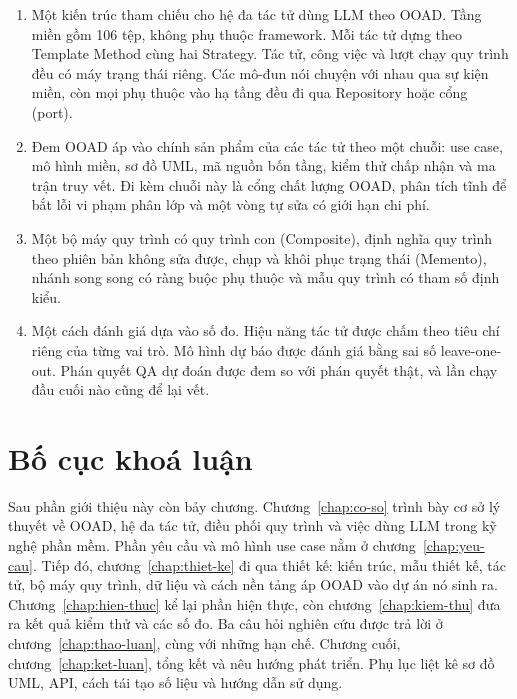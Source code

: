 \begin{enumerate}
\item Một kiến trúc tham chiếu cho hệ đa tác tử dùng LLM theo OOAD. Tầng miền gồm 106 tệp, không phụ thuộc framework. Mỗi tác tử dựng theo Template Method cùng hai Strategy. Tác tử, công việc và lượt chạy quy trình đều có máy trạng thái riêng. Các mô-đun nói chuyện với nhau qua sự kiện miền, còn mọi phụ thuộc vào hạ tầng đều đi qua Repository hoặc cổng (port).
\item Đem OOAD áp vào chính sản phẩm của các tác tử theo một chuỗi: use case, mô hình miền, sơ đồ UML, mã nguồn bốn tầng, kiểm thử chấp nhận và ma trận truy vết. Đi kèm chuỗi này là cổng chất lượng OOAD, phân tích tĩnh để bắt lỗi vi phạm phân lớp và một vòng tự sửa có giới hạn chi phí.
\item Một bộ máy quy trình có quy trình con (Composite), định nghĩa quy trình theo phiên bản không sửa được, chụp và khôi phục trạng thái (Memento), nhánh song song có ràng buộc phụ thuộc và mẫu quy trình có tham số định kiểu.
\item Một cách đánh giá dựa vào số đo. Hiệu năng tác tử được chấm theo tiêu chí riêng của từng vai trò. Mô hình dự báo được đánh giá bằng sai số leave-one-out. Phán quyết QA dự đoán được đem so với phán quyết thật, và lần chạy đầu cuối nào cũng để lại vết.
\end{enumerate}

\section{Bố cục khoá luận}

Sau phần giới thiệu này còn bảy chương. Chương~\ref{chap:co-so} trình bày cơ sở lý thuyết về OOAD, hệ đa tác tử, điều phối quy trình và việc dùng LLM trong kỹ nghệ phần mềm. Phần yêu cầu và mô hình use case nằm ở chương~\ref{chap:yeu-cau}. Tiếp đó, chương~\ref{chap:thiet-ke} đi qua thiết kế: kiến trúc, mẫu thiết kế, tác tử, bộ máy quy trình, dữ liệu và cách nền tảng áp OOAD vào dự án nó sinh ra. Chương~\ref{chap:hien-thuc} kể lại phần hiện thực, còn chương~\ref{chap:kiem-thu} đưa ra kết quả kiểm thử và các số đo. Ba câu hỏi nghiên cứu được trả lời ở chương~\ref{chap:thao-luan}, cùng với những hạn chế. Chương cuối, chương~\ref{chap:ket-luan}, tổng kết và nêu hướng phát triển. Phụ lục liệt kê sơ đồ UML, API, cách tái tạo số liệu và hướng dẫn sử dụng.
